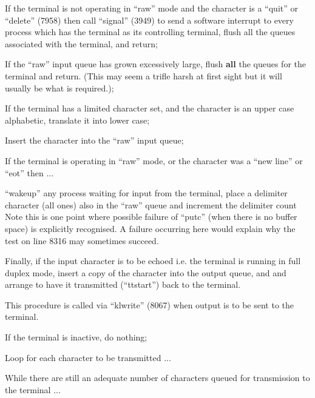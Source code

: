 \item[8344:] If the terminal is not operating
in ``raw'' mode and the character
is a ``quit'' or ``delete'' (7958)
then call ``signal'' (3949) to send
a software interrupt to every
process which has the terminal as
its controlling terminal, flush
all the queues associated with
the terminal, and return;

\item[8349:] If the ``raw'' input queue has
grown excessively large, flush
{\bf all} the queues for the terminal
and return. (This may seem a
trifle harsh at first sight but
it will usually be what is
required.);

\item[8353:] If the terminal has a limited
character set, and the character
is an upper case alphabetic,
translate it into lower case;

\item[8355:] Insert the character into the
``raw'' input queue;

\item[8356:] If the terminal is operating in
``raw'' mode, or the character was
a ``new line'' or ``eot'' then ...

\item[8357:] ``wakeup'' any process waiting for
input from the terminal, place a
delimiter character (all ones)
also in the ``raw'' queue and
increment the delimiter count
Note this is one point where possible failure of ``putc'' (when
there is no buffer space) is
explicitly recognised. A failure
occurring here would explain why
the test on line 8316 may sometimes succeed.

\item[8361:] Finally, if the input character
is to be echoed i.e. the terminal
is running in full duplex mode,
insert a copy of the character
into the output queue, and and
arrange to have it transmitted
(``ttstart'') back to the terminal.
\ed


This procedure is called via ``klwrite''
(8067) when output is to be sent to the
terminal.

\bd
\item[8556:] If the terminal is
inactive, do nothing;

\item[8558:] Loop for each character to be
transmitted ...

\item[8560:] While there are still an adequate
number of characters queued for
transmission to the terminal ...

